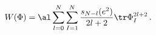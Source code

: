 \begin{equation}
W(\Phi)=\al \sum_{l=0}^{N}\sum_{I=1}^{N} \frac{s_{N-l}(e^2)}{2l+2}\tr %
\Phi_I^{2l+2} \, .
\end{equation}

